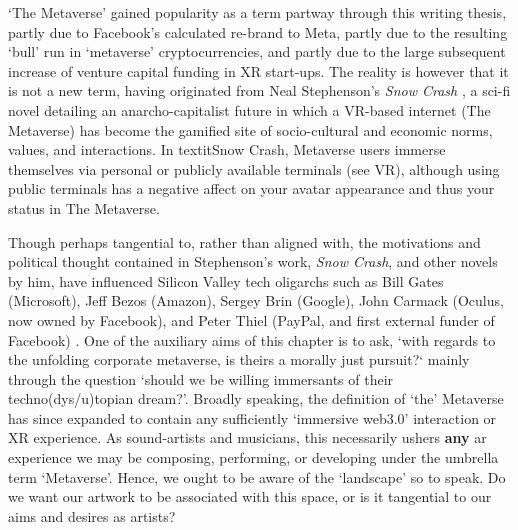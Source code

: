 `The Metaverse' gained popularity as a term partway through this writing thesis, partly due to Facebook's calculated re-brand to Meta, partly due to the resulting `bull' run in `metaverse' cryptocurrencies, and partly due to the large subsequent increase of venture capital funding in XR start-ups. The reality is however that it is not a new term, having originated from Neal Stephenson's \textit{Snow Crash} \citep[]{stephenson1992}, a sci-fi novel detailing an anarcho-capitalist future in which a VR-based internet (The Metaverse) has become the gamified site of socio-cultural and economic norms, values, and interactions. In textit{Snow Crash}, Metaverse users immerse themselves via personal or publicly available terminals (see VR), although using public terminals has a negative affect on your avatar appearance and thus your status in The Metaverse.

Though perhaps tangential to, rather than aligned with, the motivations and political thought contained in Stephenson's work, \textit{Snow Crash}, and other novels by him, have influenced Silicon Valley tech oligarchs such as Bill Gates (Microsoft), Jeff Bezos (Amazon), Sergey Brin (Google), John Carmack (Oculus, now owned by Facebook), and Peter Thiel (PayPal, and first external funder of Facebook) \citep[]{rogers2021}. One of the auxiliary aims of this chapter is to ask, `with regards to the unfolding corporate metaverse, is theirs a morally just pursuit?` mainly through the question `should we be willing immersants of their techno(dys/u)topian dream?'. Broadly speaking, the definition of `the' Metaverse has since expanded to contain any sufficiently `immersive web3.0' interaction or XR experience. As sound-artists and musicians, this necessarily ushers \textbf{any} \gls{ar} experience we may be composing, performing, or developing under the umbrella term `Metaverse'. Hence, we ought to be aware of the `landscape' so to speak. Do we want our artwork to be associated with this space, or is it tangential to our aims and desires as artists?

